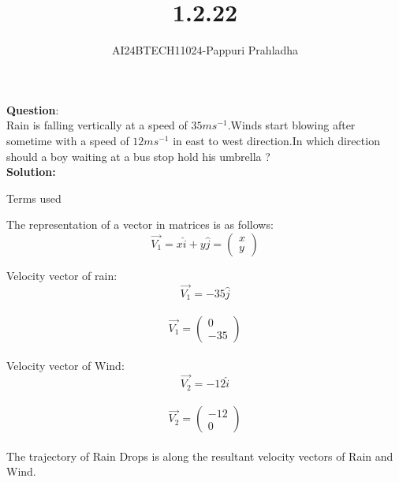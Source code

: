 \documentclass[journal]{IEEEtran}
\begin{document}

\vspace{3cm}

\title{1.2.22}
\author{AI24BTECH11024-Pappuri Prahladha}
{\let\newpage\relax\maketitle}

\renewcommand{\thefigure}{\theenumi}
\renewcommand{\thetable}{\theenumi}
\setlength{\intextsep}{10pt} %


\renewcommand{\thetable}{\theenumi}


\textbf{Question}:\\
Rain is falling vertically at a speed of $35ms^{-1}$.Winds start blowing after sometime with a speed of $12ms^{-1}$ in east to west direction.In which direction should a boy waiting at a bus stop hold his umbrella ?
\\
\textbf{Solution: }
\begin{table}[h!]
    \renewcommand{\thetable}{1}
    \centering
    
    \caption{Terms used}
    \label{TABLE 1:}
\end{table}

The representation of a vector in matrices is as follows:\\

\begin{equation}
    \vec{V_{1}}=x\hat{i}+y\hat{j}=\begin{pmatrix}
        x\\
        y
    \end{pmatrix}
\end{equation}

Velocity vector of rain:\\
    \[\vec{V_{1}}=-35\hat{j}\]\\
\begin{equation}
\vec{V_{1}}=\begin{pmatrix}
0\\
-35
\end{pmatrix}
\end{equation}\\
Velocity vector of Wind:\\
    \[\vec{V_{2}}=-12\hat{i}\]\\
\begin{equation}
\vec{V_{2}}=\begin{pmatrix}
-12\\
0
\end{pmatrix}
\end{equation}\\
The trajectory of Rain Drops is along the resultant velocity vectors of Rain and Wind.\\
\end{document}
